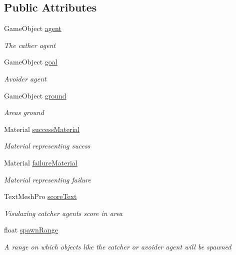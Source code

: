 \subsection*{Public Attributes}
\begin{DoxyCompactItemize}
\item 
Game\+Object \mbox{\hyperlink{class_agent_area_a418d0b4fb39de6bd36d27e5be38cdd05}{agent}}
\begin{DoxyCompactList}\small\item\em The cather agent \end{DoxyCompactList}\item 
Game\+Object \mbox{\hyperlink{class_agent_area_aea62a791bd893662a5d2b42a6e58b145}{goal}}
\begin{DoxyCompactList}\small\item\em Avoider agent \end{DoxyCompactList}\item 
Game\+Object \mbox{\hyperlink{class_agent_area_aedfe9c4d21ccdf422e044875c2c85ae2}{ground}}
\begin{DoxyCompactList}\small\item\em Areas ground \end{DoxyCompactList}\item 
Material \mbox{\hyperlink{class_agent_area_aded12dd771ca702e85b5f543c5f74b20}{success\+Material}}
\begin{DoxyCompactList}\small\item\em Material representing sucess \end{DoxyCompactList}\item 
Material \mbox{\hyperlink{class_agent_area_a24e71471a4565b2c5d92562b4d8986a6}{failure\+Material}}
\begin{DoxyCompactList}\small\item\em Material representing failure \end{DoxyCompactList}\item 
Text\+Mesh\+Pro \mbox{\hyperlink{class_agent_area_a98d76e4d56dfb61b22f5c9a1bd7536df}{score\+Text}}
\begin{DoxyCompactList}\small\item\em Visulazing catcher agents score in area \end{DoxyCompactList}\item 
float \mbox{\hyperlink{class_agent_area_a382c14ea2bc0912d97d99989db609775}{spawn\+Range}}
\begin{DoxyCompactList}\small\item\em A range on which objects like the catcher or avoider agent will be spawned \end{DoxyCompactList}\end{DoxyCompactItemize}
